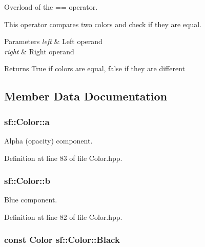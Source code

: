 Overload of the == operator. 

This operator compares two colors and check if they are equal.


\begin{DoxyParams}{Parameters}
{\em left} & Left operand \\
\hline
{\em right} & Right operand\\
\hline
\end{DoxyParams}
\begin{DoxyReturn}{Returns}
True if colors are equal, false if they are different 
\end{DoxyReturn}


\subsection{Member Data Documentation}
\hypertarget{classsf_1_1_color_a56dbdb47d5f040d9b78ac6a0b8b3a831}{
\subsubsection[{a}]{ sf\-::\-Color\-::a}}\label{classsf_1_1_color_a56dbdb47d5f040d9b78ac6a0b8b3a831}


Alpha (opacity) component. 



Definition at line 83 of file Color.\-hpp.

\hypertarget{classsf_1_1_color_a6707aedd0609c8920e12df5d7abc53cb}{
\subsubsection[{b}]{ sf\-::\-Color\-::b}}\label{classsf_1_1_color_a6707aedd0609c8920e12df5d7abc53cb}


Blue component. 



Definition at line 82 of file Color.\-hpp.

\hypertarget{classsf_1_1_color_a77c688197b981338f0b19dc58bd2facd}{
\subsubsection[{Black}]{\setlength{\rightskip}{0pt plus 5cm}const {\bf Color} sf\-::\-Color\-::\-Black\hspace{0.3cm}{\ttfamily [static]}}}\label{classsf_1_1_color_a77c688197b981338f0b19dc58bd2facd}


